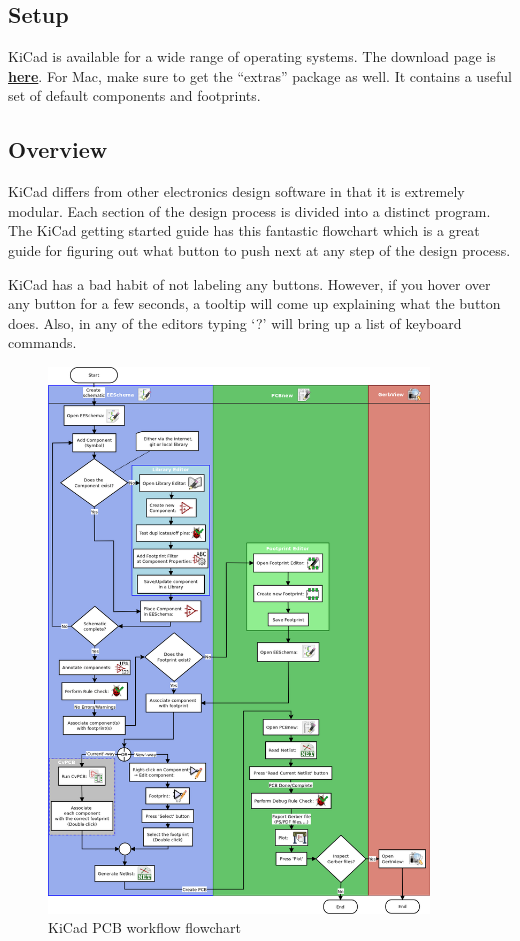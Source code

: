 \documentclass[12pt, oneside]{article}
\begin{document}
\subsection{Setup}
KiCad is available for a wide range of operating systems. The download page is \href{http://kicad-pcb.org/download/}{\textbf{here}}. For Mac, make sure to get the ``extras'' package as well. It contains a useful set of default components and footprints.

\subsection{Overview}
KiCad differs from other electronics design software in that it is extremely modular. Each section of the design process is divided into a distinct program. The KiCad getting started guide has this fantastic flowchart which is a great guide for figuring out what button to push next at any step of the design process.

KiCad has a bad habit of not labeling any buttons. However, if you hover over any button for a few seconds, a tooltip will come up explaining what the button does. Also, in any of the editors typing `?' will bring up a list of keyboard commands.

\begin{figure}[H]
\includegraphics[width=0.9\textwidth]{kicad_flowchart}
\centering
\caption{KiCad PCB workflow flowchart}
\end{figure}
\end{document}

